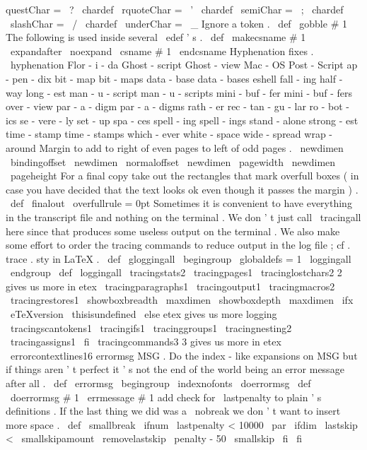 questChar
=
\
?
\
chardef
\
rquoteChar
=
\
'
\
chardef
\
semiChar
=
\
;
\
chardef
\
slashChar
=
\
/
\
chardef
\
underChar
=
\
_
%
Ignore
a
token
.
%
\
def
\
gobble
#
1
{
}
%
The
following
is
used
inside
several
\
edef
'
s
.
\
def
\
makecsname
#
1
{
\
expandafter
\
noexpand
\
csname
#
1
\
endcsname
}
%
Hyphenation
fixes
.
\
hyphenation
{
Flor
-
i
-
da
Ghost
-
script
Ghost
-
view
Mac
-
OS
Post
-
Script
ap
-
pen
-
dix
bit
-
map
bit
-
maps
data
-
base
data
-
bases
eshell
fall
-
ing
half
-
way
long
-
est
man
-
u
-
script
man
-
u
-
scripts
mini
-
buf
-
fer
mini
-
buf
-
fers
over
-
view
par
-
a
-
digm
par
-
a
-
digms
rath
-
er
rec
-
tan
-
gu
-
lar
ro
-
bot
-
ics
se
-
vere
-
ly
set
-
up
spa
-
ces
spell
-
ing
spell
-
ings
stand
-
alone
strong
-
est
time
-
stamp
time
-
stamps
which
-
ever
white
-
space
wide
-
spread
wrap
-
around
}
%
Margin
to
add
to
right
of
even
pages
to
left
of
odd
pages
.
\
newdimen
\
bindingoffset
\
newdimen
\
normaloffset
\
newdimen
\
pagewidth
\
newdimen
\
pageheight
%
For
a
final
copy
take
out
the
rectangles
%
that
mark
overfull
boxes
(
in
case
you
have
decided
%
that
the
text
looks
ok
even
though
it
passes
the
margin
)
.
%
\
def
\
finalout
{
\
overfullrule
=
0pt
}
%
Sometimes
it
is
convenient
to
have
everything
in
the
transcript
file
%
and
nothing
on
the
terminal
.
We
don
'
t
just
call
\
tracingall
here
%
since
that
produces
some
useless
output
on
the
terminal
.
We
also
make
%
some
effort
to
order
the
tracing
commands
to
reduce
output
in
the
log
%
file
;
cf
.
trace
.
sty
in
LaTeX
.
%
\
def
\
gloggingall
{
\
begingroup
\
globaldefs
=
1
\
loggingall
\
endgroup
}
%
\
def
\
loggingall
{
%
\
tracingstats2
\
tracingpages1
\
tracinglostchars2
%
2
gives
us
more
in
etex
\
tracingparagraphs1
\
tracingoutput1
\
tracingmacros2
\
tracingrestores1
\
showboxbreadth
\
maxdimen
\
showboxdepth
\
maxdimen
\
ifx
\
eTeXversion
\
thisisundefined
\
else
%
etex
gives
us
more
logging
\
tracingscantokens1
\
tracingifs1
\
tracinggroups1
\
tracingnesting2
\
tracingassigns1
\
fi
\
tracingcommands3
%
3
gives
us
more
in
etex
\
errorcontextlines16
}
%
%
errormsg
{
MSG
}
.
Do
the
index
-
like
expansions
on
MSG
but
if
things
%
aren
'
t
perfect
it
'
s
not
the
end
of
the
world
being
an
error
message
%
after
all
.
%
\
def
\
errormsg
{
\
begingroup
\
indexnofonts
\
doerrormsg
}
\
def
\
doerrormsg
#
1
{
\
errmessage
{
#
1
}
}
%
add
check
for
\
lastpenalty
to
plain
'
s
definitions
.
If
the
last
thing
%
we
did
was
a
\
nobreak
we
don
'
t
want
to
insert
more
space
.
%
\
def
\
smallbreak
{
\
ifnum
\
lastpenalty
<
10000
\
par
\
ifdim
\
lastskip
<
\
smallskipamount
\
removelastskip
\
penalty
-
50
\
smallskip
\
fi
\
fi
}
